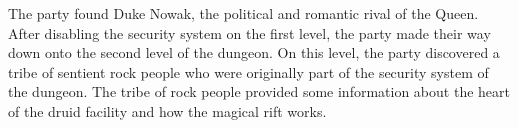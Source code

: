 The party found Duke Nowak, the political and romantic rival of the Queen.
After disabling the security system on the first level, the party made their way down onto the second level of the dungeon.
On this level, the party discovered a tribe of sentient rock people who were originally part of the security system of the dungeon.
The tribe of rock people provided some information about the heart of the druid facility and how the magical rift works.
